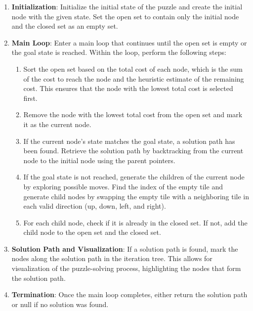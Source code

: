 \documentclass[12pt]{report}
\begin{document}
\begin{enumerate}
  \item \textbf{Initialization}: Initialize the initial state of the puzzle and create the initial node with the given state. Set the open set to contain only the initial node and the closed set as an empty set.
  
  \item \textbf{Main Loop}: Enter a main loop that continues until the open set is empty or the goal state is reached. Within the loop, perform the following steps:
  
    \begin{enumerate}
      \item Sort the open set based on the total cost of each node, which is the sum of the cost to reach the node and the heuristic estimate of the remaining cost. This ensures that the node with the lowest total cost is selected first.
      
      \item Remove the node with the lowest total cost from the open set and mark it as the current node.
      
      \item If the current node's state matches the goal state, a solution path has been found. Retrieve the solution path by backtracking from the current node to the initial node using the parent pointers.
      
      \item If the goal state is not reached, generate the children of the current node by exploring possible moves. Find the index of the empty tile and generate child nodes by swapping the empty tile with a neighboring tile in each valid direction (up, down, left, and right).
      
      \item For each child node, check if it is already in the closed set. If not, add the child node to the open set and the closed set.
    \end{enumerate}
    
  \item \textbf{Solution Path and Visualization}: If a solution path is found, mark the nodes along the solution path in the iteration tree. This allows for visualization of the puzzle-solving process, highlighting the nodes that form the solution path.
  
  \item \textbf{Termination}: Once the main loop completes, either return the solution path or null if no solution was found.
\end{enumerate}
\end{document}
